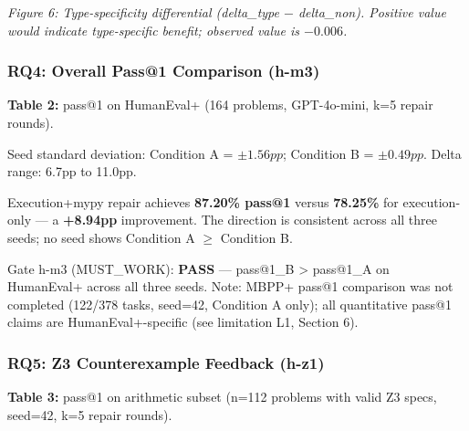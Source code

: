 \textit{Figure 6: Type-specificity differential (delta\_type $-$ delta\_non). Positive value would indicate type-specific benefit; observed value is $-0.006$.}

\subsubsection{RQ4: Overall Pass@1 Comparison (h-m3)}

\textbf{Table 2:} pass@1 on HumanEval+ (164 problems, GPT-4o-mini, k=5 repair rounds).

\begin{table}[htbp]
\centering
{}
\end{table}

Seed standard deviation: Condition A = $\pm 1.56pp$; Condition B = $\pm 0.49pp$. Delta range: 6.7pp to 11.0pp.

Execution+mypy repair achieves \textbf{87.20\% pass@1} versus \textbf{78.25\%} for execution-only --- a \textbf{+8.94pp} improvement. The direction is consistent across all three seeds; no seed shows Condition A $\geq$ Condition B.

Gate h-m3 (MUST\_WORK): \textbf{PASS} --- pass@1\_B > pass@1\_A on HumanEval+ across all three seeds. Note: MBPP+ pass@1 comparison was not completed (122/378 tasks, seed=42, Condition A only); all quantitative pass@1 claims are HumanEval+-specific (see limitation L1, Section 6).

\subsubsection{RQ5: Z3 Counterexample Feedback (h-z1)}

\textbf{Table 3:} pass@1 on arithmetic subset (n=112 problems with valid Z3 specs, seed=42, k=5 repair rounds).

\begin{table}[htbp]
\centering
{}
\end{table}

